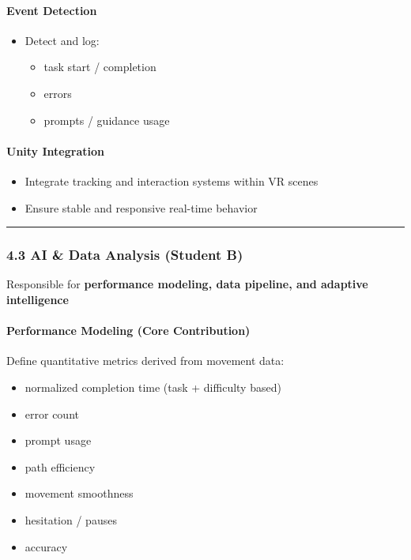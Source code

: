 \documentclass[11pt]{article}
\begin{document}
\paragraph*{Event Detection}

\begin{itemize}
\item Detect and log:
\begin{itemize}
\item task start / completion
\item errors
\item prompts / guidance usage
\end{itemize}
\end{itemize}

\paragraph*{Unity Integration}

\begin{itemize}
\item Integrate tracking and interaction systems within VR scenes
\item Ensure stable and responsive real-time behavior
\end{itemize}

\hrule


\subsubsection*{4.3 AI \& Data Analysis (Student B)}


Responsible for \textbf{performance modeling, data pipeline, and adaptive intelligence}


\paragraph*{Performance Modeling (Core Contribution)}

Define quantitative metrics derived from movement data:


\begin{itemize}
\item normalized completion time (task + difficulty based)
\item error count
\item prompt usage
\item path efficiency
\item movement smoothness
\item hesitation / pauses
\item accuracy
\end{itemize}
\end{document}
